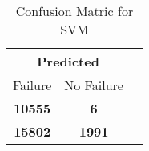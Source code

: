 \begin{table}[] 
\caption{Confusion Matric for SVM} 
\label{Table: Prediction Accuracy-NoneSVM90.0EKF-ignoresolarPanelDipole-solarPanelDipole} 
\centering 
\begin{tabular} 
 {@{}ccc@{}} 
\toprule 
\multicolumn{2}{c}{\textbf{Predicted}}
 \\ \midrule 
\multicolumn{1}{|c|}{Failure} & 
\multicolumn{1}{c|}{No Failure}
 \\ \midrule 
\multicolumn{1}{|c|}{\color{red}\textbf{10555}} & 
\multicolumn{1}{c|}{\color{red}\textbf{6}}
 \\ \midrule 
\multicolumn{1}{|c|}{\color{green}\textbf{15802}} & 
\multicolumn{1}{c|}{\color{green}\textbf{1991}}
 \\ \bottomrule 
\end{tabular} 
\end{table} 
